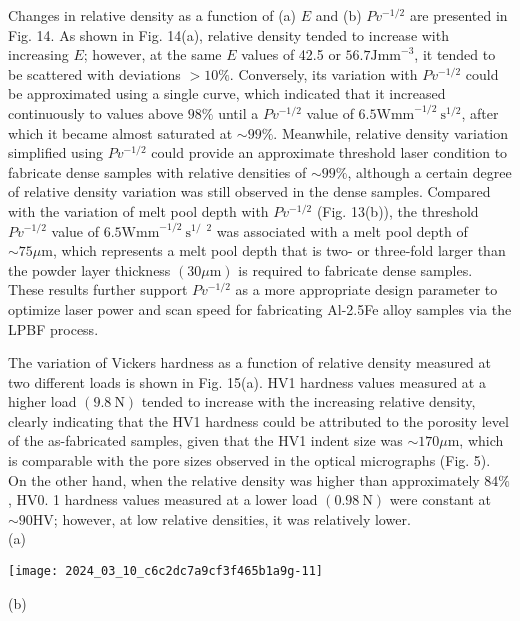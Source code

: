 \documentclass[10pt]{article}
\begin{document}
Changes in relative density as a function of (a) $E$ and (b) $P v^{-1 / 2}$ are presented in Fig. 14. As shown in Fig. 14(a), relative density tended to increase with increasing $E$; however, at the same $E$ values of 42.5 or $56.7 \mathrm{Jmm}^{-3}$, it tended to be scattered with deviations $>10 \%$. Conversely, its variation with $P v^{-1 / 2}$ could be approximated using a single curve, which indicated that it increased continuously to values above $98 \%$ until a $P v^{-1 / 2}$ value of $6.5 \mathrm{Wmm}^{-1 / 2} \mathrm{~s}^{1 / 2}$, after which it became almost saturated at $\sim 99 \%$. Meanwhile, relative density variation simplified using $P v^{-1 / 2}$ could provide an approximate threshold laser condition to fabricate dense samples with relative densities of $\sim 99 \%$, although a certain degree of relative density variation was still observed in the dense samples. Compared with the variation of melt pool depth with $P v^{-1 / 2}$ (Fig. 13(b)), the threshold $P v^{-1 / 2}$ value of $6.5 \mathrm{Wmm}^{-1 / 2} \mathrm{~s}^{1 /}$ ${ }^{2}$ was associated with a melt pool depth of $\sim 75 \mu \mathrm{m}$, which represents a melt pool depth that is two- or three-fold larger than the powder layer thickness $(30 \mu \mathrm{m})$ is required to fabricate dense samples. These results further support $P v^{-1 / 2}$ as a more appropriate design parameter to optimize laser power and scan speed for fabricating Al-2.5Fe alloy samples via the LPBF process.

The variation of Vickers hardness as a function of relative density measured at two different loads is shown in Fig. 15(a). HV1 hardness values measured at a higher load $(9.8 \mathrm{~N})$ tended to increase with the increasing relative density, clearly indicating that the HV1 hardness could be attributed to the porosity level of the as-fabricated samples, given that the HV1 indent size was $\sim 170 \mu \mathrm{m}$, which is comparable with the pore sizes observed in the optical micrographs (Fig. 5). On the other hand, when the relative density was higher than approximately $84 \%$, HV0. 1 hardness values measured at a lower load $(0.98 \mathrm{~N})$ were constant at $\sim 90 \mathrm{HV}$; however, at low relative densities, it was relatively lower.\\
(a)

\begin{center}
\texttt{[image: 2024\_03\_10\_c6c2dc7a9cf3f465b1a9g-11]}
\end{center}

(b)
\end{document}
